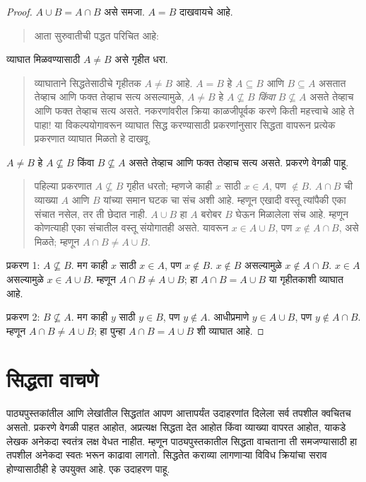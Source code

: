 \begin{proof}
$A \cup B = A \cap B$ असे समजा. $A = B$ दाखवायचे आहे.
\begin{quote}
आता सुरुवातीची पद्धत परिचित आहे:
\end{quote}
व्याघात मिळवण्यासाठी $A \neq B$ असे गृहीत धरा.
\begin{quote}
व्याघाताने सिद्धतेसाठीचे गृहीतक $A \neq B$ आहे. $A = B$ हे $A \subseteq B$ आणि $B \subseteq A$ असतात तेव्हाच आणि फक्त तेव्हाच सत्य असल्यामुळे, $A \neq B$ हे $A \nsubseteq B$ \emph{किंवा} $B \nsubseteq A$ असते तेव्हाच आणि फक्त तेव्हाच सत्य असते. नकरणांवरील क्रिया काळजीपूर्वक करणे किती महत्त्वाचे आहे ते पाहा!{} या विकल्पयोगावरून व्याघात सिद्ध करण्यासाठी प्रकरणांनुसार सिद्धता वापरून प्रत्येक प्रकरणात व्याघात मिळतो हे दाखवू.
\end{quote}
$A \neq B$ हे $A \nsubseteq B$ किंवा $B \nsubseteq A$ असते तेव्हाच आणि फक्त तेव्हाच सत्य असते. प्रकरणे वेगळी पाहू.
\begin{quote}
पहिल्या प्रकरणात $A \nsubseteq B$ गृहीत धरतो; म्हणजे काही $x$ साठी $x \in A$, पण $\notin B$. $A \cap B$ ची व्याख्या $A$ आणि $B$ यांच्या समान घटक चा संच अशी आहे. म्हणून एखादी वस्तू त्यांपैकी एका संचात नसेल, तर ती छेदात नाही. $A \cup B$ हा $A$ बरोबर $B$ घेऊन मिळालेला संच आहे. म्हणून कोणत्याही एका संचातील वस्तू संयोगातही असते. यावरून $x \in A \cup B$, पण $x \notin A \cap B$, असे मिळते; म्हणून $A \cap B \neq A \cup B$.
\end{quote}

प्रकरण 1: $A \nsubseteq B$. मग काही $x$ साठी $x \in A$, पण $x \notin B$. $x \notin B$ असल्यामुळे $x \notin A \cap B$. $x \in A$ असल्यामुळे $x \in A \cup B$. म्हणून $A \cap B \neq A \cup B$; हा $A \cap B = A \cup B$ या गृहीतकाशी व्याघात आहे.

प्रकरण 2: $B \nsubseteq A$. मग काही $y$ साठी $y \in B$, पण $y \notin A$. आधीप्रमाणे $y \in A \cup B$, पण $y \notin A \cap B$. म्हणून $A \cap B \neq A \cup B$; हा पुन्हा $A \cap B = A \cup B$ शी व्याघात आहे.
\end{proof}











\section{सिद्धता वाचणे}\label{mth:prf:rea:sec}

पाठ्यपुस्तकांतील आणि लेखांतील सिद्धतांत आपण आत्तापर्यंत उदाहरणांत दिलेला सर्व तपशील क्वचितच असतो. प्रकरणे वेगळी पाहत आहोत, अप्रत्यक्ष सिद्धता देत आहोत किंवा व्याख्या वापरत आहोत, याकडे लेखक अनेकदा स्वतंत्र लक्ष वेधत नाहीत. म्हणून पाठ्यपुस्तकातील सिद्धता वाचताना ती समजण्यासाठी हा तपशील अनेकदा स्वतः भरून काढावा लागतो. सिद्धतेत कराव्या लागणाऱ्या विविध क्रियांचा सराव होण्यासाठीही हे उपयुक्त आहे. एक उदाहरण पाहू.

